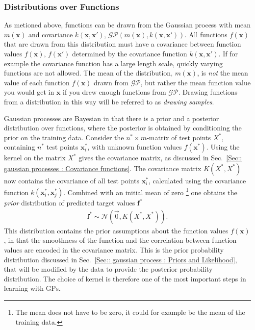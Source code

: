 \documentclass[twoside,english]{uiofysmaster}
\begin{document}
\subsubsection{Distributions over Functions}

As metioned above, functions can be drawn from the Gaussian process with mean $m(\textbf{x})$ and covariance $k(\textbf{x}, \textbf{x}')$, $\mathcal{GP}(m(\textbf{x}), k(\textbf{x}, \textbf{x}'))$. All functions $f(\textbf{x})$ that are drawn from this distribution must have a covariance between function values $f(\textbf{x})$, $f(\textbf{x}')$ determined by the covariance function $k(\textbf{x}, \textbf{x}')$. If for example the covariance function has a large length scale, quickly varying functions are not allowed. The mean of the distribution, $m(\textbf{x})$, is \textit{not} the mean value of each function $f(\textbf{x})$ drawn from $\mathcal{GP}$, but rather the mean function value you would get in $\textbf{x}$ if you drew enough functions from $\mathcal{GP}$. Drawing functions from a distribution in this way will be referred to as \textit{drawing samples}.

Gaussian processes are Bayesian in that there is a prior and a posterior distribution over functions, where the posterior is obtained by conditioning the prior on the training data. Consider the $n^* \times m$-matrix of test points $X^*$, containing $n^*$ test points $\textbf{x}_i^*$, with unknown function values $f(\textbf{x}^*)$. Using the kernel on the matrix $X^*$ gives the covariance matrix, as discussed in Sec.~\ref{Sec:: gaussian processes : Covariance functions}. The covariance matrix $K(X^*, X^*)$ now contains the covariance of all test points $\textbf{x}^*_i$, calculated using the covariance function $k(\textbf{x}_i^*, \textbf{x}_j^*)$. Combined with an initial mean of zero \footnote{The mean does not have to be zero, it could for example be the mean of the training data.} one obtains the \textit{prior} distribution of predicted target values $\textbf{f}^*$
\begin{align}
\textbf{f}^* \sim \mathcal{N} (\vec{0}, K(X^*, X^*)).\label{Eq:: gaussian process : Prior GP}
\end{align} 
This distribution contains the prior assumptions about the function values $f(\textbf{x})$, in that the smoothness of the function and the correlation between function values are encoded in the covariance matrix. This is the prior probability distribution discussed in Sec.~\ref{Sec:: gaussian process : Priors and Likelihood}, that will be modified by the data to provide the posterior probability distribution. The choice of kernel is therefore one of the most important steps in learning with GPs. 
\end{document}
